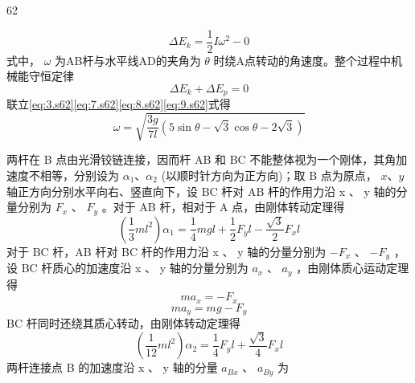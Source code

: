 \begin{solution}{62}
\begin{subsolution}
\begin{subsubsolution}
\begin{equation}
                \Delta E _ {k} = \frac {1}{2} I \omega^{2} - 0
                \label{eq:8.s62}
            \end{equation}
            式中， $\omega$ 为AB杆与水平线AD的夹角为 $\theta$ 时绕A点转动的角速度。整个过程中机械能守恒定律
            \begin{equation}
                \Delta E _ {k} + \Delta E _ {p} = 0
                \label{eq:9.s62}
            \end{equation}
            联立\eqref{eq:3.s62}\eqref{eq:7.s62}\eqref{eq:8.s62}\eqref{eq:9.s62}式得
            \begin{equation}
                \omega = \sqrt {\frac {3 g}{7 l} \left(5 \sin \theta - \sqrt {3} \cos \theta - 2 \sqrt {3}\right)}
                \label{eq:10.s62}
            \end{equation}
        \end{subsubsolution}
    \end{subsolution}
    \begin{subsolution}
        两杆在 B 点由光滑铰链连接，因而杆 AB 和 BC 不能整体视为一个刚体，其角加速度不相等，分别设为 $\alpha_{1} 、 \alpha_{2}$ (以顺时针方向为正方向)；取 B 点为原点， $x 、 y$ 轴正方向分别水平向右、竖直向下，设 BC 杆对 AB 杆的作用力沿 x 、 y 轴的分量分别为 $F_{x}$ 、 $F_{y}$ 。对于 AB 杆，相对于 A 点，由刚体转动定理得
        \begin{equation}
            \left(\frac {1}{3} m l^{2}\right) \alpha_{1} = \frac {1}{4} m g l + \frac {1}{2} F _ {y} l - \frac {\sqrt {3}}{2} F _ {x} l
            \label{eq:11.s62}
        \end{equation}
        对于 BC 杆，AB 杆对 BC 杆的作用力沿 x 、 y 轴的分量分别为 $-F_{x}$ 、 $-F_{y}$ ，设 BC 杆质心的加速度沿 x 、 y 轴的分量分别为 $a_{x}$ 、 $a_{y}$ ，由刚体质心运动定理得
        \begin{equation}
            m a _ {x} = - F _ {x}
            \label{eq:12.s62}
        \end{equation}
        \begin{equation}
            m a _ {y} = m g - F _ {y}
            \label{eq:13.s62}
        \end{equation}
        BC 杆同时还绕其质心转动，由刚体转动定理得
        \begin{equation}
            \left(\frac {1}{12} m l^{2}\right) \alpha_{2} = \frac {1}{4} F _ {y} l + \frac {\sqrt {3}}{4} F _ {x} l
            \label{eq:14.s62}
        \end{equation}
        两杆连接点 B 的加速度沿 x 、 y 轴的分量 $a_{Bx}$ 、 $a_{By}$ 为

\end{subsolution}
\end{solution}
